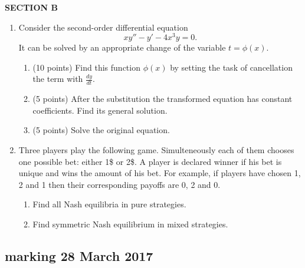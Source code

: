 \textbf{SECTION B}

\begin{enumerate}[resume]


\item Consider the second-order differential equation
\[
xy'' - y' - 4{x^3}y = 0.
\]
It can be solved by an appropriate change of the variable $t = \phi (x)$.
\begin{enumerate}
  \item (10 points) Find this function $\phi (x)$ by setting the task of cancellation the term with $\frac{{dy}}{{dt}}$.
  \item (5 points) After the substitution the transformed equation has constant coefficients. Find its general solution.
  \item (5 points) Solve the original equation.
\end{enumerate}

\item Three players play the following game. Simulteneously each of them chooses one possible bet: either 1\$ or 2\$. A player is declared winner if his bet is unique and wins the amount of his bet. For example, if players have chosen 1, 2 and 1 then their corresponding payoffs are 0, 2 and 0.

\begin{enumerate}
  \item Find all Nash equilibria in pure strategies.
  \item Find symmetric Nash equilibrium in mixed strategies.
\end{enumerate}

\end{enumerate}


\subsection{marking 28 March 2017}

